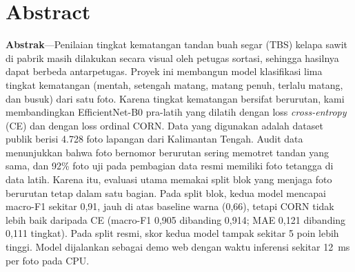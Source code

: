 \documentclass[10pt,a4paper,twocolumn]{article}
\begin{document}

\section*{Abstract}
\noindent\textbf{Abstrak}---Penilaian tingkat kematangan tandan buah segar (TBS) kelapa sawit di pabrik masih dilakukan secara visual oleh petugas sortasi, sehingga hasilnya dapat berbeda antarpetugas. Proyek ini membangun model klasifikasi lima tingkat kematangan (mentah, setengah matang, matang penuh, terlalu matang, dan busuk) dari satu foto. Karena tingkat kematangan bersifat berurutan, kami membandingkan EfficientNet-B0 pra-latih yang dilatih dengan loss \emph{cross-entropy} (CE) dan dengan loss ordinal CORN. Data yang digunakan adalah dataset publik berisi 4.728 foto lapangan dari Kalimantan Tengah. Audit data menunjukkan bahwa foto bernomor berurutan sering memotret tandan yang sama, dan 92\% foto uji pada pembagian data resmi memiliki foto tetangga di data latih. Karena itu, evaluasi utama memakai split blok yang menjaga foto berurutan tetap dalam satu bagian. Pada split blok, kedua model mencapai macro-F1 sekitar 0,91, jauh di atas baseline warna (0,66), tetapi CORN tidak lebih baik daripada CE (macro-F1 0,905 dibanding 0,914; MAE 0,121 dibanding 0,111 tingkat). Pada split resmi, skor kedua model tampak sekitar 5 poin lebih tinggi. Model dijalankan sebagai demo web dengan waktu inferensi sekitar 12~ms per foto pada CPU.
\end{document}
